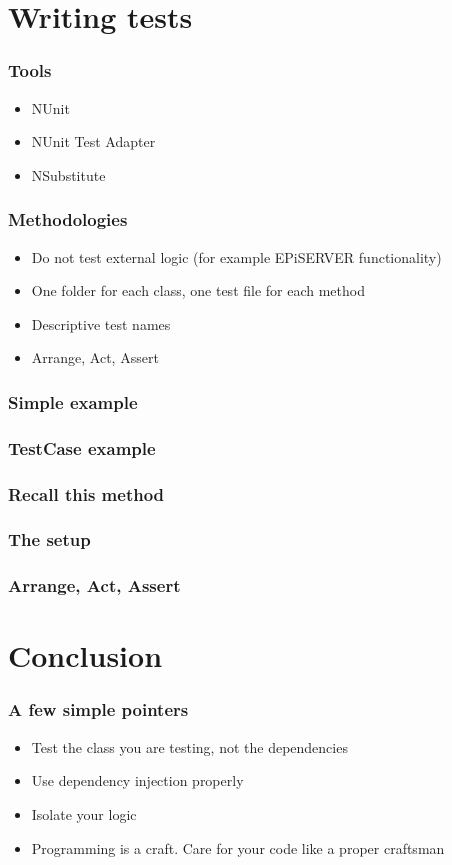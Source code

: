 \documentclass{beamer}
\begin{document}
	\section{Writing tests}
		\begin{frame}
			\frametitle{Tools} \pause
			\begin{itemize}
				\item NUnit \pause
				\item NUnit Test Adapter \pause
				\item NSubstitute
			\end{itemize}
		\end{frame}
		\begin{frame}
			\frametitle{Methodologies} \pause
			\begin{itemize}
				\item Do not test external logic (for example EPiSERVER functionality)\pause
				\item One folder for each class, one test file for each method \pause
				\item Descriptive test names \pause
				\item Arrange, Act, Assert 
			\end{itemize}
		\end{frame}
		\begin{frame}
			\frametitle{Simple example}
			
		\end{frame}
		\begin{frame}
			\frametitle{TestCase example}
			
		\end{frame}
		\begin{frame}
			\frametitle{Recall this method}
			
		\end{frame}

		\begin{frame}
			\frametitle{The setup}
			
		\end{frame}

		\begin{frame}
			\frametitle{Arrange, Act, Assert}
			
		\end{frame}

		\section{Conclusion}
		\begin{frame}
			\frametitle{A few simple pointers} \pause
			\begin{itemize}
				\item Test the class you are testing, not the dependencies \pause
				\item Use dependency injection properly \pause
				\item Isolate your logic \pause
				\item Programming is a craft. Care for your code like a proper craftsman 
			\end{itemize}
		\end{frame}
\end{document}
